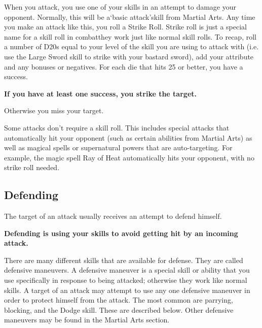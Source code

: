 \documentclass[twoside]{book}
\begin{document}
    {  
    When you attack, you use one of your skills in an attempt to damage your opponent. Normally, this will be a`basic attack'skill from Martial Arts. Any time you make an attack like this, you roll a Strike Roll. Strike roll is just a special name for a skill roll in combatthey work just like normal skill rolls. To recap, roll a number of D20s equal to your level of the skill you are using to attack with (i.e. use the Large Sword skill to strike with your bastard sword), add your attribute and any bonuses or negatives. For each die that hits 25 or better, you have a success.

 \textbf{If you have at least one success, you strike the target.}

Otherwise you miss your target.
    }
  
    {  
    Some attacks don't require a skill roll. This includes special attacks that automatically hit your opponent (such as certain abilities from Martial Arts) as well as magical spells or supernatural powers that are auto-targeting. For example, the magic spell Ray of Heat automatically hits your opponent, with no strike roll needed.
    }
  
    

\subsection{Defending}
    
    {  
    The target of an attack usually receives an attempt to defend himself.

 \textbf{Defending is using your skills to avoid getting hit by an incoming attack.}

There are many different skills that are available for defense. They are called defensive maneuvers. A defensive maneuver is a special skill or ability that you use specifically in response to being attacked; otherwise they work like normal skills. A target of an attack may attempt to use any one defensive maneuver in order to protect himself from the attack. The most common are parrying, blocking, and the Dodge skill. These are described below. Other defensive maneuvers may be found in the Martial Arts section.
    }
  
\end{document}
